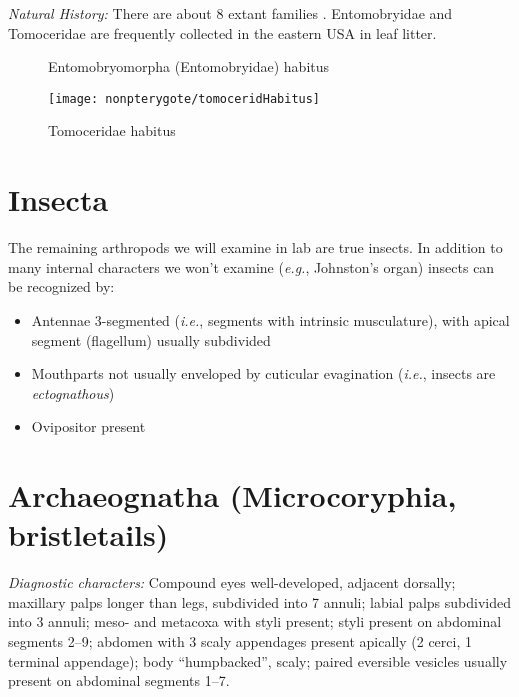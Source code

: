 \noindent{}\textit{Natural History:} There are about 8 extant families \citep{SotoAdames501}. Entomobryidae and Tomoceridae are frequently collected in the eastern USA in leaf litter.\vspace{3mm}

\begin{figure}[ht!]
  \centering
  \caption{Entomobryomorpha (Entomobryidae) habitus \citep[redrawn from][Fig. 17]{bhlitem30465Insects}}
  \label{fig:entomobry}
\end{figure}

\begin{figure}[ht!]
  \centering
    \texttt{[image: nonpterygote/tomoceridHabitus]}
  \caption{Tomoceridae habitus \citep[redrawn from][Fig. 16]{bhlitem30465Insects}}
  \label{fig:tomocer}
\end{figure}

\section*{Insecta}
The remaining arthropods we will examine in lab are true insects. In addition to many internal characters we won't examine (\textit{e.g.}, Johnston's organ) insects can be recognized by:
\begin{itemize}
\item Antennae 3-segmented (\textit{i.e.}, segments with intrinsic musculature), with apical segment (flagellum) usually subdivided
\item Mouthparts not usually enveloped by cuticular evagination (\textit{i.e.}, insects are \textit{ectognathous})
\item Ovipositor present
\end{itemize}

\section{Archaeognatha (Microcoryphia, bristletails)}
\noindent{}\textit{Diagnostic characters:} Compound eyes well-developed, adjacent dorsally; maxillary palps longer than legs, subdivided into 7 annuli; labial palps subdivided into 3 annuli; meso- and metacoxa with styli present; styli present on abdominal segments 2--9; abdomen with 3 scaly appendages present apically (2 cerci, 1 terminal appendage); body ``humpbacked'', scaly; paired eversible vesicles usually present on abdominal segments 1--7.\vspace{3mm}

